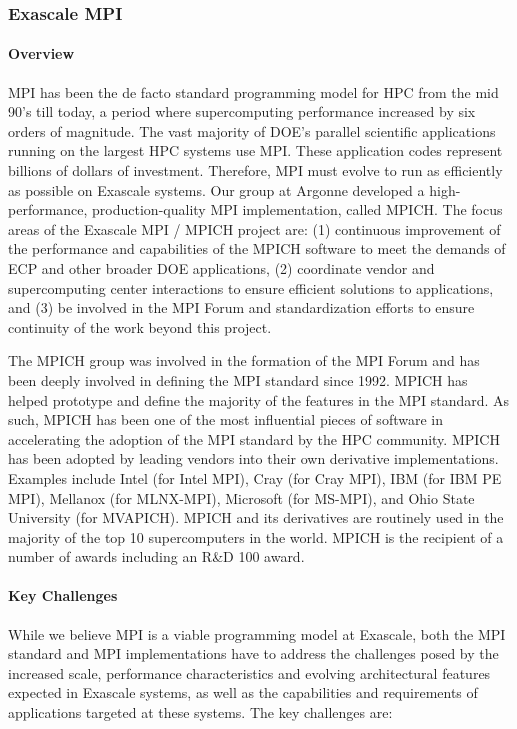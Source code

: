 \subsubsection{ Exascale MPI} \label{subsubsect:mpich}
\paragraph{Overview}

MPI has been the de facto standard programming model for HPC from the
mid 90's till today, a period where supercomputing performance
increased by six orders of magnitude.  The vast majority of DOE's
parallel scientific applications running on the largest HPC systems
use MPI. These application codes represent billions of dollars of
investment. Therefore, MPI must evolve to run as efficiently as
possible on Exascale systems. Our group at Argonne developed a
high-performance, production-quality MPI implementation, called MPICH.
The focus areas of the Exascale MPI / MPICH project are: (1)
continuous improvement of the performance and capabilities of the
MPICH software to meet the demands of ECP and other broader DOE
applications, (2) coordinate vendor and supercomputing center
interactions to ensure efficient solutions to applications, and (3) be
involved in the MPI Forum and standardization efforts to ensure
continuity of the work beyond this project.

The MPICH group was involved in the formation of the MPI Forum and has been
deeply involved in defining the MPI standard since 1992. MPICH has
helped prototype and define the majority of the features in the MPI
standard. As such, MPICH has been one of the most influential pieces of
software in accelerating the adoption of the MPI standard by the HPC
community. MPICH has been adopted by leading vendors into their own
derivative implementations. Examples include Intel (for Intel MPI), Cray
(for Cray MPI), IBM (for IBM PE MPI), Mellanox (for MLNX-MPI), Microsoft
(for MS-MPI), and Ohio State University (for MVAPICH). MPICH and its
derivatives are routinely used in the majority of the top 10 supercomputers in
the world. MPICH is the recipient of a number of awards including
an R\&D 100 award.

\paragraph{Key Challenges}

While we believe MPI is a viable programming model at Exascale, both
the MPI standard and MPI implementations have to address the
challenges posed by the increased scale, performance characteristics
and evolving architectural features expected in Exascale systems, as
well as the capabilities and requirements of applications targeted at
these systems. The key challenges are:

